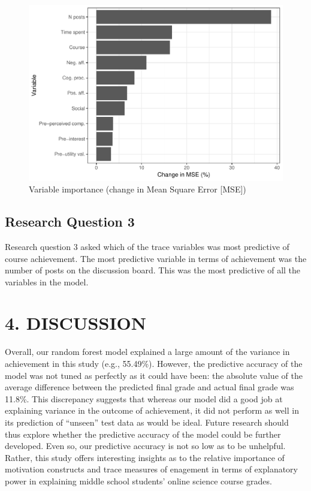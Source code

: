\documentclass[acmart]{apa6}
\theoremstyle{definition}
\theoremstyle{definition}
\theoremstyle{definition}
\theoremstyle{remark}
\begin{document}
\begin{figure}
\centering
\includegraphics{LAK_Manuscript_files/figure-latex/unnamed-chunk-3-1.pdf}
\caption{\label{fig:unnamed-chunk-3}Variable importance (change in Mean
Square Error {[}MSE{]})}
\end{figure}

\subsection{Research Question 3}\label{research-question-3}

Research question 3 asked which of the trace variables was most
predictive of course achievement. The most predictive variable in terms
of achievement was the number of posts on the discussion board. This was
the most predictive of all the variables in the model.

\section{4. DISCUSSION}\label{discussion}

Overall, our random forest model explained a large amount of the
variance in achievement in this study (e.g., 55.49\%). However, the
predictive accuracy of the model was not tuned as perfectly as it could
have been: the absolute value of the average difference between the
predicted final grade and actual final grade was 11.8\%. This
discrepancy suggests that whereas our model did a good job at explaining
variance in the outcome of achievement, it did not perform as well in
its prediction of \enquote{unseen} test data as would be ideal. Future
research should thus explore whether the predictive accuracy of the
model could be further developed. Even so, our predictive accuracy is
not so low as to be unhelpful. Rather, this study offers interesting
insights as to the relative importance of motivation constructs and
trace measures of enagement in terms of explanatory power in explaining
middle school students' online science course grades.
\end{document}
